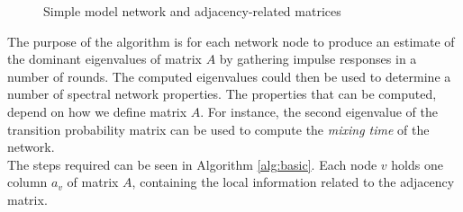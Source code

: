 \documentclass[a4paper,11pt,twoside]{report}
\begin{document}
\begin{figure}[h]
\centering
{}\hfill
{} \hfill
{}
\caption{Simple model network and adjacency-related matrices}
\label{fig:modeled_network_example}
\end{figure}

The purpose of the algorithm is for each network node to produce an estimate of the dominant eigenvalues of matrix $A$ by gathering impulse responses in a number of rounds. The computed eigenvalues could then be used to determine a number of spectral network properties. The properties that can be computed, depend on how we define matrix $A$. For instance, the second eigenvalue of the transition probability matrix can be used to compute the \textit{mixing time} of the network.\\

The steps required can be seen in Algorithm \ref{alg:basic}. Each node $v$ holds one column $a_v$ of matrix $A$, containing the local information related to the adjacency matrix.
\end{document}
